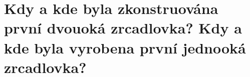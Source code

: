 \section{Kdy a kde byla zkonstruována první dvouoká zrcadlovka? Kdy a kde byla vyrobena první jednooká zrcadlovka?}